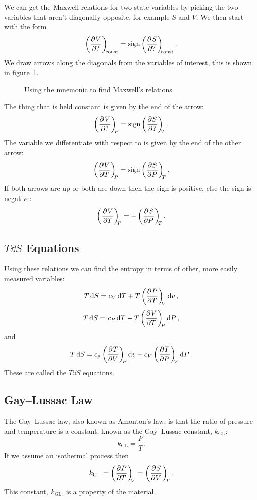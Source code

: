 \documentclass[a4paper]{article}
\newcommand{\gaylussac}{k_\mathrm{GL}}
\begin{document}
    We can get the Maxwell relations for two state variables by picking the two variables that aren't diagonally opposite, for example \(S\) and \(V\).
    We then start with the form
    \[\left(\pdv[]{V}{?}\right)_{\!\!{\text{const}}} = \text{sign}\left(\pdv[]{S}{?}\right)_{\!\!{\text{const}}}.\]
    We draw arrows along the diagonals from the variables of interest, this is shown in figure~\ref{fig:mnemonic maxwell relations}.
    \begin{figure}[ht]
        \centering
        \caption{Using the mnemonic to find Maxwell's relations}
        \label{fig:mnemonic maxwell relations}
    \end{figure}
    The thing that is held constant is given by the end of the arrow:
    \[\left(\pdv[]{V}{?}\right)_{\!\!{P}} = \text{sign}\left(\pdv[]{S}{?}\right)_{\!\!{T}}.\]
    The variable we differentiate with respect to is given by the end of the other arrow:
    \[\left(\pdv[]{V}{T}\right)_{\!\!{P}} = \text{sign}\left(\pdv[]{S}{P}\right)_{\!\!{T}}.\]
    If both arrows are up or both are down then the sign is positive, else the sign is negative:
    \[\left(\pdv[]{V}{T}\right)_{\!\!{P}} = -\left(\pdv[]{S}{P}\right)_{\!\!{T}}.\]
    
    \subsection{\texorpdfstring{\(T\dd{S}\)}{TdS} Equations}
    Using these relations we can find the entropy in terms of other, more easily measured variables:
    \[T\dd{S} = c_V\dd{T} + T\left(\pdv[]{P}{T}\right)_{\!\!{V}}\dd{v},\]
    \[T\dd{S} = c_P\dd{T} - T\left(\pdv[]{V}{T}\right)_{\!\!{P}}\dd{P},\]
    and
    \[T\dd{S} = c_p\left(\pdv[]{T}{V}\right)_{\!\!{P}}\dd{v} + c_V\left(\pdv[]{T}{P}\right)_{\!\!{V}}\dd{P}.\]
    These are called the \(T\dd{S}\) equations.
    
    \subsection{Gay--Lussac Law}
    The Gay--Lussac law, also known as Amonton's law, is that the ratio of pressure and temperature is a constant, known as the Gay--Lussac constant, \(\gaylussac\):
    \[\gaylussac = \frac{P}{T}.\]
    If we assume an isothermal process then
    \[\gaylussac = \pdvconst{P}{T}{V} = \pdvconst{S}{V}{T}.\]
    This constant, \(\gaylussac\), is a property of the material.
    
\end{document}
